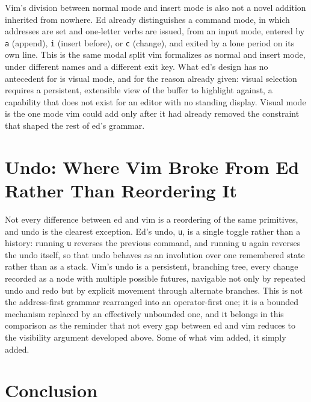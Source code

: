\documentclass[11pt]{article}
\begin{document}
Vim's division between normal mode and insert mode is also not a novel addition inherited from nowhere. Ed already distinguishes a command mode, in which addresses are set and one-letter verbs are issued, from an input mode, entered by \texttt{a} (append), \texttt{i} (insert before), or \texttt{c} (change), and exited by a lone period on its own line. This is the same modal split vim formalizes as normal and insert mode, under different names and a different exit key. What ed's design has no antecedent for is visual mode, and for the reason already given: visual selection requires a persistent, extensible view of the buffer to highlight against, a capability that does not exist for an editor with no standing display. Visual mode is the one mode vim could add only after it had already removed the constraint that shaped the rest of ed's grammar.

\section{Undo: Where Vim Broke From Ed Rather Than Reordering It}

Not every difference between ed and vim is a reordering of the same primitives, and undo is the clearest exception. Ed's undo, \texttt{u}, is a single toggle rather than a history: running \texttt{u} reverses the previous command, and running \texttt{u} again reverses the undo itself, so that undo behaves as an involution over one remembered state rather than as a stack. Vim's undo is a persistent, branching tree, every change recorded as a node with multiple possible futures, navigable not only by repeated undo and redo but by explicit movement through alternate branches. This is not the address-first grammar rearranged into an operator-first one; it is a bounded mechanism replaced by an effectively unbounded one, and it belongs in this comparison as the reminder that not every gap between ed and vim reduces to the visibility argument developed above. Some of what vim added, it simply added.

\section{Conclusion}
\end{document}

